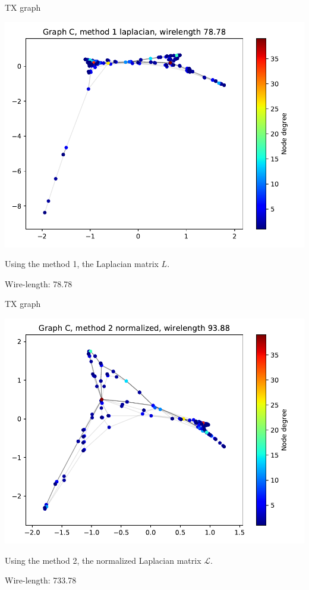 \documentclass[serif, 12pt]{beamer}
\begin{document}
\begin{frame}{TX graph}
\begin{center}
\includegraphics[scale=0.5]{C/laplacian.pdf}
\end{center}
Using the method 1, the Laplacian matrix $L$.

Wire-length: 78.78
\end{frame}

\begin{frame}{TX graph}
\begin{center}
\includegraphics[scale=0.5]{C/norm.pdf}
\end{center}
Using the method 2, the normalized Laplacian matrix $\mathcal L$.

Wire-length: 733.78
\end{frame}
\end{document}
